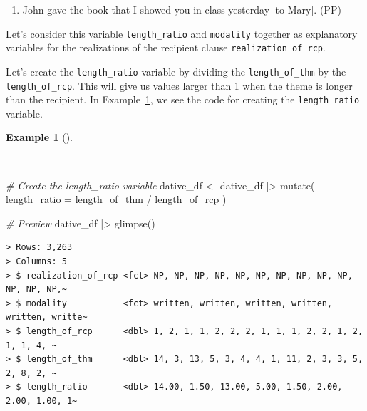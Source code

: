 \documentclass[
  letterpaper,
  DIV=11,
  numbers=noendperiod]{scrreprt}
\newenvironment{Shaded}{\begin{snugshade}}{\end{snugshade}}
\newcommand{\AttributeTok}[1]{\textcolor[rgb]{0.00,0.00,0.00}{#1}}
\newcommand{\CommentTok}[1]{\textcolor[rgb]{0.00,0.00,0.00}{\textit{#1}}}
\newcommand{\FunctionTok}[1]{\textcolor[rgb]{0.00,0.00,0.00}{#1}}
\newcommand{\NormalTok}[1]{\textcolor[rgb]{0.00,0.00,0.00}{#1}}
\newcommand{\OtherTok}[1]{\textcolor[rgb]{0.00,0.00,0.00}{#1}}
\newcommand{\SpecialCharTok}[1]{\textcolor[rgb]{0.00,0.00,0.00}{#1}}
\providecommand{\tightlist}{%
  \setlength{\itemsep}{0pt}\setlength{\parskip}{0pt}}\usepackage{longtable,booktabs,array}
\theoremstyle{definition}
\newtheorem{example}{Example}[chapter]
\theoremstyle{remark}
\begin{document}
\begin{enumerate}
\def\labelenumi{\arabic{enumi}.}
\setcounter{enumi}{2}
\tightlist
\item
  John gave the book that I showed you in class yesterday {[}to Mary{]}.
  (PP)
\end{enumerate}

Let's consider this variable \texttt{length\_ratio} and
\texttt{modality} together as explanatory variables for the realizations
of the recipient clause \texttt{realization\_of\_rcp}.

Let's create the \texttt{length\_ratio} variable by dividing the
\texttt{length\_of\_thm} by the \texttt{length\_of\_rcp}. This will give
us values larger than 1 when the theme is longer than the recipient. In
Example~\ref{exm-ida-cat-create-length-ratio}, we see the code for
creating the \texttt{length\_ratio} variable.

\begin{example}[]\protect\hypertarget{exm-ida-cat-create-length-ratio}{}\label{exm-ida-cat-create-length-ratio}

~

\begin{Shaded}
\begin{Highlighting}[]
\CommentTok{\# Create the \textasciigrave{}length\_ratio\textasciigrave{} variable}
\NormalTok{dative\_df }\OtherTok{\textless{}{-}}
\NormalTok{  dative\_df }\SpecialCharTok{|\textgreater{}}
  \FunctionTok{mutate}\NormalTok{(}
    \AttributeTok{length\_ratio =}\NormalTok{ length\_of\_thm }\SpecialCharTok{/}\NormalTok{ length\_of\_rcp}
\NormalTok{  )}

\CommentTok{\# Preview}
\NormalTok{dative\_df }\SpecialCharTok{|\textgreater{}} \FunctionTok{glimpse}\NormalTok{()}
\end{Highlighting}
\end{Shaded}

\begin{verbatim}
> Rows: 3,263
> Columns: 5
> $ realization_of_rcp <fct> NP, NP, NP, NP, NP, NP, NP, NP, NP, NP, NP, NP, NP,~
> $ modality           <fct> written, written, written, written, written, writte~
> $ length_of_rcp      <dbl> 1, 2, 1, 1, 2, 2, 2, 1, 1, 1, 2, 2, 1, 2, 1, 1, 4, ~
> $ length_of_thm      <dbl> 14, 3, 13, 5, 3, 4, 4, 1, 11, 2, 3, 3, 5, 2, 8, 2, ~
> $ length_ratio       <dbl> 14.00, 1.50, 13.00, 5.00, 1.50, 2.00, 2.00, 1.00, 1~
\end{verbatim}

\end{example}
\end{document}
